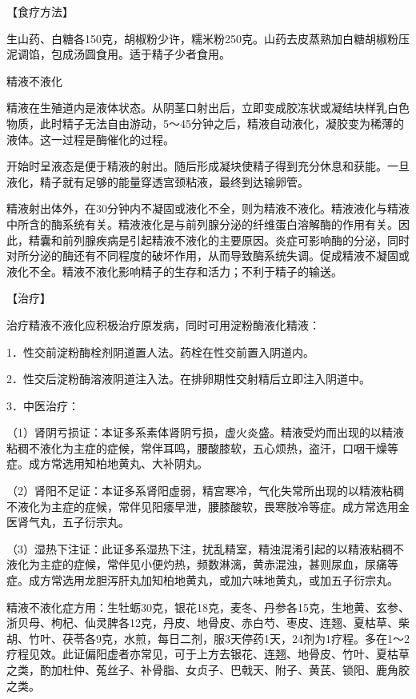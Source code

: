 \documentclass[12pt,UTF8,openany]{ctexbook}
\begin{document}
【食疗方法】

生山药、白糖各150克，胡椒粉少许，糯米粉250克。山药去皮蒸熟加白糖胡椒粉压泥调馅，包成汤圆食用。适于精子少者食用。





精液不液化


精液在生殖道内是液体状态。从阴茎口射出后，立即变成胶冻状或凝结块样乳白色物质，此时精子无法自由游动，5～45分钟之后，精液自动液化，凝胶变为稀薄的液体。这一过程是酶催化的过程。

开始时呈液态是便于精液的射出。随后形成凝块使精子得到充分休息和获能。一旦液化，精子就有足够的能量穿透宫颈粘液，最终到达输卵管。

精液射出体外，在30分钟内不凝固或液化不全，则为精液不液化。精液液化与精液中所含的酶系统有关。精液液化是与前列腺分泌的纤维蛋白溶解酶的作用有关。因此，精囊和前列腺疾病是引起精液不液化的主要原因。炎症可影响酶的分泌，同时对所分泌的酶还有不同程度的破坏作用，从而导致酶系统失调。促成精液不凝固或液化不全。精液不液化影响精子的生存和活力；不利于精子的输送。

【治疗】

治疗精液不液化应积极治疗原发病，同时可用淀粉酶液化精液：

1．性交前淀粉酶栓剂阴道置人法。药栓在性交前置入阴道内。

2．性交后淀粉酶溶液阴道注入法。在排卵期性交射精后立即注入阴道中。

3．中医治疗：

（1）肾阴亏损证：本证多系素体肾阴亏损，虚火炎盛。精液受灼而出现的以精液粘稠不液化为主症的症候，常伴耳鸣，腰酸膝软，五心烦热，盗汗，口咽干燥等症。成方常选用知柏地黄丸、大补阴丸。

（2）肾阳不足证：本证多系肾阳虚弱，精宫寒冷，气化失常所出现的以精液粘稠不液化为主症的症候，常伴见阳痿早泄，腰膝酸软，畏寒肢冷等症。成方常选用金医肾气丸，五子衍宗丸。

（3）湿热下注证：此证多系湿热下注，扰乱精室，精浊混淆引起的以精液粘稠不液化为主症的症候，常伴见小便灼热，频数淋漓，黄赤混浊，甚则尿血，尿痛等症。成方常选用龙胆泻肝丸加知柏地黄丸，或加六味地黄丸，或加五子衍宗丸。

精液不液化症方用：生牡蛎30克，银花18克，麦冬、丹参各15克，生地黄、玄参、浙贝母、枸杞、仙灵脾各12克，丹皮、地骨皮、赤白芍、枣皮、连翘、夏枯草、柴胡、竹叶、茯苓各9克，水煎，每日二剂，服3天停药1天，24剂为1疗程。多在1～2疗程见效。此证偏阳虚者亦常见，可于上方去银花、连翘、地骨皮、竹叶、夏枯草之类，酌加杜仲、菟丝子、补骨脂、女贞子、巴戟天、附子、黄芪、锁阳、鹿角胶之类。
\end{document}
